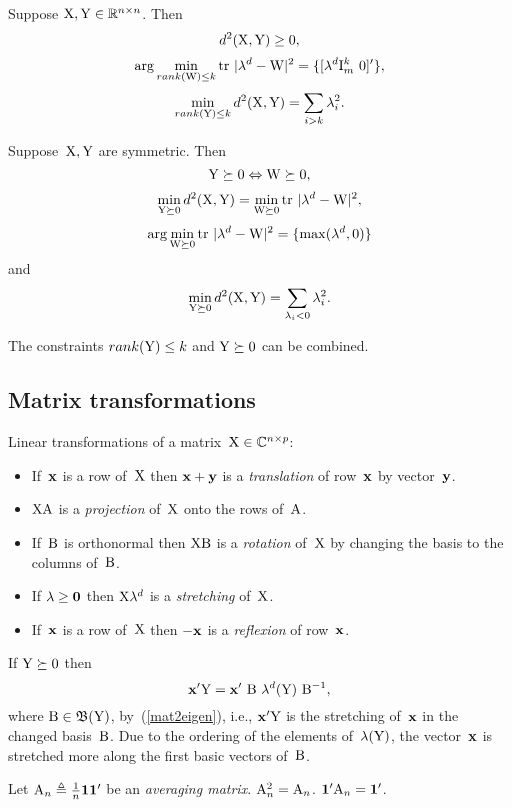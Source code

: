 \documentclass[10pt,a4paper]{article}
\theoremstyle{plain} \newtheorem{Lem}{Lemma}
\begin{document}
Suppose $\mathrm X, \mathrm Y \in \mathbb R^{n \times n}$.
Then
$$ d^2(\mathrm X,\mathrm Y) \ge 0, $$
$$ \arg \min_{rank(\mathrm W) \le k} \mathrm {tr} \  |\mathbf \lambda^d -\mathrm W|^2 = \{[\mathbf \lambda^d \mathrm I_m^k \ \mathrm 0]' \}, $$
$$ \min_{rank(\mathrm Y) \le k} d^2 (\mathrm X, \mathrm Y) = \sum_{i > k} \lambda_i^2. $$

Suppose~$\mathrm X, \mathrm Y$ are symmetric.
Then
$$ \mathrm Y \succeq 0 \Leftrightarrow \mathrm W \succeq 0, $$
$$ \min_{\mathrm Y \succeq 0} d^2 (\mathrm X, \mathrm Y) = \min_{\mathrm W \succeq 0} \mathrm {tr} \  |\mathbf \lambda^d -\mathrm W|^2, $$
$$ \arg \min_{\mathrm W \succeq 0} \mathrm {tr} \  |\mathbf \lambda^d -\mathrm W|^2 = \{\max (\mathbf \lambda^d, \mathrm 0) \} $$
and
$$ \min_{\mathrm Y \succeq 0} d^2 (\mathrm X, \mathrm Y) = \sum_{\lambda_i < 0} \lambda_i^2. $$

The constraints $rank(\mathrm Y) \le k$ and $\mathrm Y \succeq 0$ can be combined.



\subsection{Matrix transformations}
Linear transformations of a matrix~$\mathrm X \in \mathbb C^{n \times p}$:
\begin{itemize}
\item If~$\mathbf x$ is a row of~$\mathrm X$ then $\mathbf x + \mathbf y$ is a {\em translation} of row~$\mathbf x$ by vector~$\mathbf y$.
\item $\mathrm X \mathrm A$ is a {\em projection} of~$\mathrm X$ onto the rows of~$\mathrm A$.
\item If~$\mathrm B$ is orthonormal then $\mathrm X \mathrm B$ is a {\em rotation} of~$\mathrm X$ by changing the basis to the columns of~$\mathrm B$.
\item If $\mathbf \lambda \ge \mathbf 0$ then $\mathrm X \mathbf \lambda^d$ is a {\em stretching} of~$\mathrm X$.
\item If~$\mathbf x$ is a row of~$\mathrm X$ then $- \mathbf x$ is a {\em reflexion} of row~$\mathbf x$.
\end{itemize}

If $\mathrm Y \succeq 0$ then
$$ \mathbf x' \mathrm Y =  \mathbf x' \ \mathrm B \ \mathbf \lambda^d(\mathrm Y) \ \mathrm B^{-1}, $$
where $\mathrm B \in \mathfrak B(\mathrm Y)$,
by~(\ref{mat2eigen}),
i.e., $\mathbf x' \mathrm Y$ is the stretching of~$\mathbf x$ in the changed basis~$\mathrm B$.
Due to the ordering of the elements of~$\mathbf \lambda(\mathrm Y)$, the vector~$\mathbf x$ is stretched more along the first basic vectors of~$\mathrm B$.

Let $\mathrm A_n \triangleq \frac 1 n \mathbf 1 \mathbf 1'$ be an {\em averaging matrix}.
$\mathrm A^2_n = \mathrm A_n$.
$ \mathbf 1' \mathrm A_n = \mathbf 1'$.
\end{document}
